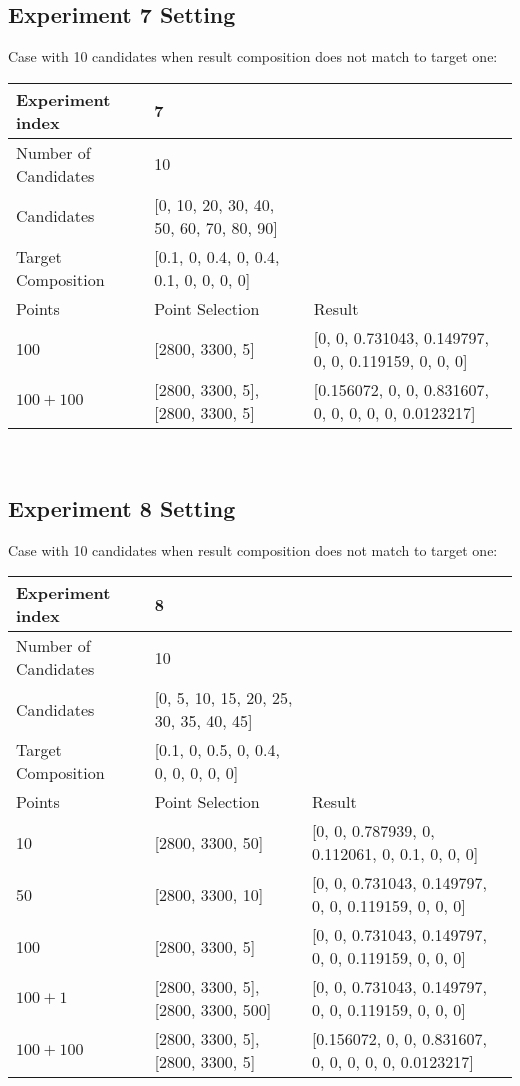 \subsection{Experiment 7 Setting}
Case with 10 candidates when result composition does not match to target one: 
\begin{table} \tiny
\begin{tabular}{l | l | l}
\hline
Experiment index & 7  \\
\hline
Number of Candidates & 10   \\
\hline
Candidates & [0, 10, 20, 30, 40, 50, 60, 70, 80, 90]  \\
\hline
Target Composition & [0.1, 0, 0.4, 0, 0.4, 0.1, 0, 0, 0, 0] \\
\hline
\hline
	Points & Point Selection & Result \\ \hline
	100 & [2800, 3300, 5] & [0, 0, 0.731043, 0.149797, 0, 0, 0.119159, 0, 0, 0] \\ \hline
	$100 + 100$ & [2800, 3300, 5], [2800, 3300, 5] & [0.156072, 0, 0, 0.831607, 0, 0, 0, 0, 0, 0.0123217] \\ \hline
\end{tabular} \\
\end{table}



\subsection{Experiment 8 Setting}
Case with 10 candidates when result composition does not match to target one: 
\begin{table} \tiny
\begin{tabular}{l | l | l}
\hline
Experiment index & 8  \\
\hline
Number of Candidates & 10   \\
\hline
Candidates & [0, 5, 10, 15, 20, 25, 30, 35, 40, 45]  \\
\hline
Target Composition & [0.1, 0, 0.5, 0, 0.4, 0, 0, 0, 0, 0] \\
\hline
\hline
	Points & Point Selection & Result \\ \hline
	10 & [2800, 3300, 50] & [0, 0, 0.787939, 0, 0.112061, 0, 0.1, 0, 0, 0] \\ \hline
	50 & [2800, 3300, 10] & [0, 0, 0.731043, 0.149797, 0, 0, 0.119159, 0, 0, 0] \\ \hline
	100 & [2800, 3300, 5] & [0, 0, 0.731043, 0.149797, 0, 0, 0.119159, 0, 0, 0] \\ \hline
	$100 + 1$ & [2800, 3300, 5], [2800, 3300, 500] & [0, 0, 0.731043, 0.149797, 0, 0, 0.119159, 0, 0, 0] \\ \hline
	$100 + 100$ & [2800, 3300, 5], [2800, 3300, 5] & [0.156072, 0, 0, 0.831607, 0, 0, 0, 0, 0, 0.0123217] \\ \hline
\end{tabular} \\
\end{table}


